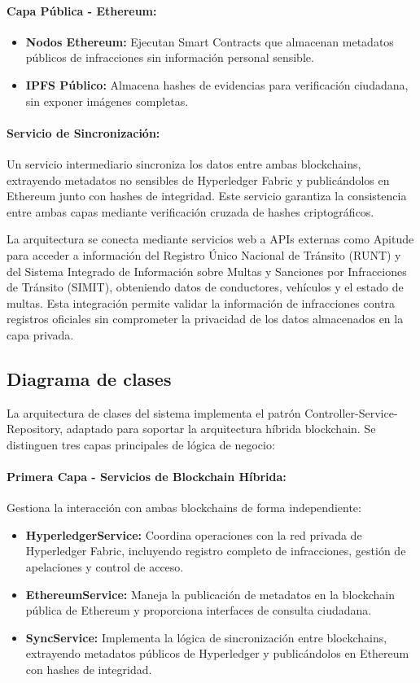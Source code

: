 \paragraph{Capa Pública - Ethereum:}
\begin{itemize}
    \item \textbf{Nodos Ethereum:} Ejecutan Smart Contracts que almacenan metadatos públicos de infracciones sin información personal sensible.
    \item \textbf{IPFS Público:} Almacena hashes de evidencias para verificación ciudadana, sin exponer imágenes completas.
\end{itemize}

\paragraph{Servicio de Sincronización:}
Un servicio intermediario sincroniza los datos entre ambas blockchains, extrayendo metadatos no sensibles de Hyperledger Fabric y publicándolos en Ethereum junto con hashes de integridad. Este servicio garantiza la consistencia entre ambas capas mediante verificación cruzada de hashes criptográficos.

La arquitectura se conecta mediante servicios web a APIs externas como Apitude para acceder a información del Registro Único Nacional de Tránsito (RUNT) y del Sistema Integrado de Información sobre Multas y Sanciones por Infracciones de Tránsito (SIMIT), obteniendo datos de conductores, vehículos y el estado de multas. Esta integración permite validar la información de infracciones contra registros oficiales sin comprometer la privacidad de los datos almacenados en la capa privada. 

 \subsection{ Diagrama de clases }
La arquitectura de clases del sistema implementa el patrón Controller-Service-Repository, adaptado para soportar la arquitectura híbrida blockchain. Se distinguen tres capas principales de lógica de negocio:

\paragraph{Primera Capa - Servicios de Blockchain Híbrida:}
Gestiona la interacción con ambas blockchains de forma independiente:
\begin{itemize}
    \item \textbf{HyperledgerService:} Coordina operaciones con la red privada de Hyperledger Fabric, incluyendo registro completo de infracciones, gestión de apelaciones y control de acceso.
    \item \textbf{EthereumService:} Maneja la publicación de metadatos en la blockchain pública de Ethereum y proporciona interfaces de consulta ciudadana.
    \item \textbf{SyncService:} Implementa la lógica de sincronización entre blockchains, extrayendo metadatos públicos de Hyperledger y publicándolos en Ethereum con hashes de integridad.
\end{itemize}

